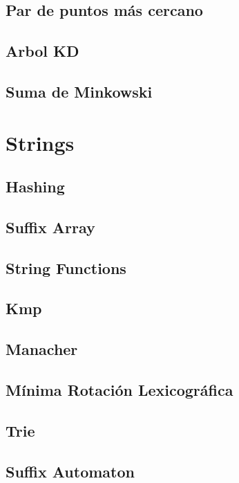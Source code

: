 \documentclass[a4paper,11pt,landscape,twocolumn]{article}
\begin{document}
\subsection{Par de puntos más cercano}

\subsection{Arbol KD}

\subsection{Suma de Minkowski}


\section{Strings} %
\subsection{Hashing}

\subsection{Suffix Array}

\subsection{String Functions}

\subsection{Kmp}

\subsection{Manacher}

\subsection{Mínima Rotación Lexicográfica}

\subsection{Trie}

\subsection{Suffix Automaton}

\end{document}
